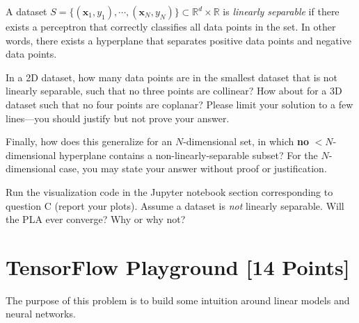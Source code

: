\begin{solution}


\end{solution}

\begin{problem}[4]
A dataset $S = \{(\mathbf{x}_1, y_1),\cdots,(\mathbf{x}_N, y_N)\} \subset \mathbb{R}^d \times \mathbb{R}$ is \emph{linearly separable} if there exists a perceptron that correctly classifies all data points in the set.
In other words, there exists a hyperplane that separates positive data points and negative data points.

In a 2D dataset, how many data points are in the smallest dataset that is not linearly separable, such that no three points are collinear? How about for a 3D dataset such that no four points are coplanar?
Please limit your solution to a few lines---you should justify but not prove your answer.

Finally, how does this generalize for an $N$-dimensional set, in which \textbf{no} $<$$N$-dimensional hyperplane contains a non-linearly-separable subset?
	For the $N$-dimensional case, you may state your answer without proof or justification.
\end{problem}
\begin{solution}

\end{solution}

\begin{problem}[2]
Run the visualization code in the Jupyter notebook section corresponding to question C (report your plots).
Assume a dataset is \emph{not} linearly separable.
Will the PLA ever converge?
Why or why not?
\end{problem}
\begin{solution}

\end{solution}

\newpage
\section{TensorFlow Playground [14 Points]}

The purpose of this problem is to build some intuition around linear models and neural networks.


